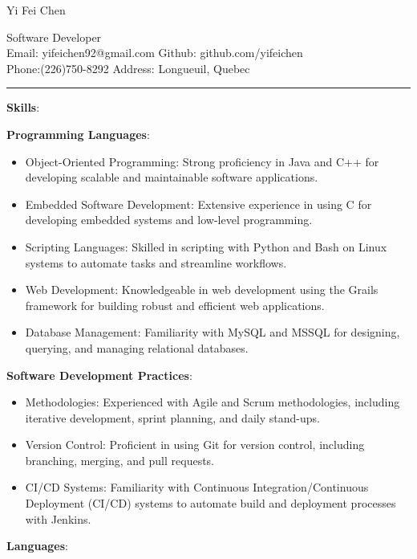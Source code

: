 \documentclass[letterpaper]{article}
\begin{document}
\begin{center}
\begin{LARGE}
 Yi Fei Chen \\
\end{LARGE}
\begin{large}
Software Developer\\
Email: yifeichen92@gmail.com
\hfill
Github: github.com/yifeichen \\
Phone:(226)750-8292 
\hfill	
Address: Longueuil, Quebec
\end{large}
\end{center}


\par\noindent\rule{\textwidth}{0.4pt}



\begin{large}
\textbf{Skills}:\\
\end{large}
\textbf{Programming Languages}:
\begin{itemize}[leftmargin=10mm]
\item Object-Oriented Programming: Strong proficiency in Java and C++ for developing scalable and maintainable software applications.
\item Embedded Software Development: Extensive experience in using C for developing embedded systems and low-level programming.
\item Scripting Languages: Skilled in scripting with Python and Bash on Linux systems to automate tasks and streamline workflows.

\item Web Development: Knowledgeable in web development using the Grails framework for building robust and efficient web applications.

\item Database Management: Familiarity with MySQL and MSSQL for designing, querying, and managing relational databases.
\end{itemize}
\textbf{Software Development Practices}:
\begin{itemize}[leftmargin=10mm]
\item Methodologies: Experienced with Agile and Scrum methodologies, including iterative development, sprint planning, and daily stand-ups.
\item Version Control: Proficient in using Git for version control, including branching, merging, and pull requests.
\item CI/CD Systems: Familiarity with Continuous Integration/Continuous Deployment (CI/CD) systems to automate build and deployment processes with Jenkins.
\end{itemize}
\textbf{Languages}:
\end{document}
